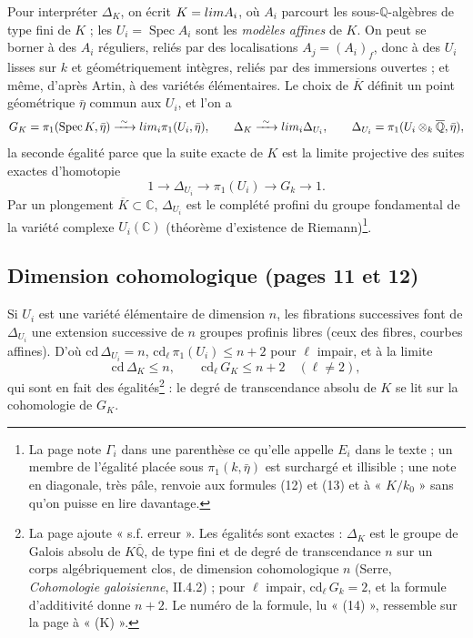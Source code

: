 \documentclass[11pt,a4paper]{article}
\begin{document}
Pour interpréter $\Delta_K$, on écrit $K = \varinjlim A_i$, où $A_i$
parcourt les sous-$\mathbb{Q}$-algèbres de type fini de $K$ ; les $U_i =
\operatorname{Spec} A_i$ sont les \emph{modèles affines} de $K$. On peut se
borner à des $A_i$ réguliers, reliés par des localisations $A_j = (A_i)_{f}$,
donc à des $U_i$ lisses sur $k$ et géométriquement intègres, reliés par des
immersions ouvertes ; et même, d'après Artin, à des variétés élémentaires.
Le choix de $\overline{K}$ définit un point géométrique $\bar\eta$ commun aux
$U_i$, et l'on a
\[
G_K = \pi_1(\operatorname{Spec} K, \bar\eta) \xrightarrow{\ \sim\ }
\varprojlim_i \pi_1(U_i, \bar\eta), \qquad
\Delta_K \xrightarrow{\ \sim\ } \varprojlim_i \Delta_{U_i}, \qquad
\Delta_{U_i} = \pi_1(U_i \otimes_k \overline{\mathbb{Q}}, \bar\eta),
\]
la seconde égalité parce que la suite exacte de $K$ est la limite projective
des suites exactes d'homotopie
\[
1 \longrightarrow \Delta_{U_i} \longrightarrow \pi_1(U_i) \longrightarrow
G_k \longrightarrow 1 .
\]
Par un plongement $\overline{K} \subset \mathbb{C}$, $\Delta_{U_i}$ est le
complété profini du groupe fondamental de la variété complexe
$U_i(\mathbb{C})$ (théorème d'existence de Riemann)\footnote{La page note
$\Gamma_i$ dans une parenthèse ce qu'elle appelle $E_i$ dans le texte ; un
membre de l'égalité placée sous $\pi_1(k, \bar\eta)$ est surchargé et
illisible ; une note en diagonale, très pâle, renvoie aux formules (12) et (13)
et à « $K/k_0$ » sans qu'on puisse en lire davantage.}.

\subsection*{Dimension cohomologique (pages 11 et 12)}

Si $U_i$ est une variété élémentaire de dimension $n$, les fibrations
successives font de $\Delta_{U_i}$ une extension successive de $n$ groupes
profinis libres (ceux des fibres, courbes affines). D'où $\mathrm{cd}\,
\Delta_{U_i} = n$, $\mathrm{cd}_\ell\, \pi_1(U_i) \le n+2$ pour $\ell$ impair,
et à la limite
\[
\mathrm{cd}\, \Delta_K \le n, \qquad \mathrm{cd}_\ell\, G_K \le n + 2 \quad
(\ell \ne 2),
\]
qui sont en fait des égalités\footnote{La page ajoute « s.f. erreur ». Les
égalités sont exactes : $\Delta_K$ est le groupe de Galois absolu de
$K\overline{\mathbb{Q}}$, de type fini et de degré de transcendance $n$ sur
un corps algébriquement clos, de dimension cohomologique $n$ (Serre,
\emph{Cohomologie galoisienne}, II.4.2) ; pour $\ell$ impair,
$\mathrm{cd}_\ell\, G_k = 2$, et la formule d'additivité donne $n+2$. Le
numéro de la formule, lu « (14) », ressemble sur la page à « (K) ».} : le
degré de transcendance absolu de $K$ se lit sur la cohomologie de $G_K$.
\end{document}
